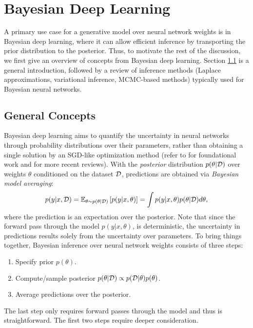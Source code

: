 
\chapter{Bayesian Deep Learning}\label{section:bayesian_dl}

A primary use case for a generative model over neural network weights is in Bayesian deep learning, where it can allow efficient inference by transporting the prior distribution to the posterior. Thus, to motivate the rest of the discussion, we first give an overview of concepts from Bayesian deep learning. Section \ref{section:bayesian_concepts} is a general introduction, followed by a review of inference methods (Laplace approximations, variational inference, MCMC-based methods) typically used for Bayesian neural networks.

\section{General Concepts} \label{section:bayesian_concepts}

Bayesian deep learning aims to quantify the uncertainty in neural networks through probability distributions over their parameters, rather than obtaining a single solution by an SGD-like optimization method (refer to \citep{mackayBayesianMethodsAdaptive1992, nealBayesianLearningNeural1996} for foundational work and \citep{goanBayesianNeuralNetworks2020,arbelPrimerBayesianNeural2023} for more recent reviews). With the \textit{posterior} distribution $p(\theta \vert \mathcal{D})$ over weights $\theta$ conditioned on the dataset $\mathcal{D}$, predictions are obtained via \textit{Bayesian model averaging}:
\begin{equation} \label{eq:model_averaging}
    p(y \vert x, \mathcal{D}) 
    = \mathbb{E}_{\theta \sim p(\theta \vert \mathcal{D})} \left[ p(y\vert x, \theta) \right]
    = \int p(y \vert x, \theta) p(\theta \vert \mathcal{D}) d\theta,
\end{equation}
where the prediction is an expectation over the posterior. Note that since the forward pass through the model $p(y \vert x, \theta)$, is deterministic, the uncertainty in predictions results solely from the uncertainty over parameters. To bring things together, Bayesian inference over neural network weights consists of three steps:
\begin{enumerate}
    \item Specify prior $p(\theta)$.
    \item Compute/sample posterior $p(\theta \vert \mathcal{D}) \propto p(\mathcal{D} \vert \theta) p(\theta)$.
    \item Average predictions over the posterior. 
\end{enumerate}
The last step only requires forward passes through the model and thus is straightforward. The first two steps require deeper consideration. 

